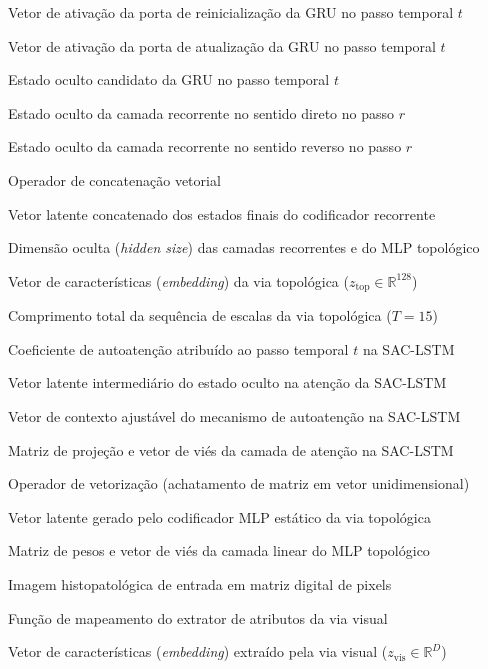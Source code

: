 \documentclass[
  12pt,		
  a4paper,	
  openright,  
  oneside,	
  chapter=TITLE,		
  section=TITLE,		
  english,	
  french,	    
  spanish,	
  brazil	    
]{abntex2}
\begin{document}
\begin{simbolos}
        \item[$r_t$] Vetor de ativação da porta de reinicialização da GRU no passo temporal $t$
        \item[$z_t$] Vetor de ativação da porta de atualização da GRU no passo temporal $t$
        \item[$\tilde{h}_t$] Estado oculto candidato da GRU no passo temporal $t$
        \item[$\overrightarrow{h}_r$] Estado oculto da camada recorrente no sentido direto no passo $r$
        \item[$\overleftarrow{h}_r$] Estado oculto da camada recorrente no sentido reverso no passo $r$
        \item[$\Vert$] Operador de concatenação vetorial
        \item[$h_{\mathrm{rec}}$] Vetor latente concatenado dos estados finais do codificador recorrente
        \item[$h$] Dimensão oculta (\textit{hidden size}) das camadas recorrentes e do MLP topológico
        \item[$z_{\mathrm{top}}$] Vetor de características (\textit{embedding}) da via topológica ($z_{\mathrm{top}} \in \mathbb{R}^{128}$)
        \item[$T$] Comprimento total da sequência de escalas da via topológica ($T = 15$)
        \item[$\alpha_t$] Coeficiente de autoatenção atribuído ao passo temporal $t$ na SAC-LSTM
        \item[$u_t$] Vetor latente intermediário do estado oculto na atenção da SAC-LSTM
        \item[$u_s$] Vetor de contexto ajustável do mecanismo de autoatenção na SAC-LSTM
        \item[$W_a, b_a$] Matriz de projeção e vetor de viés da camada de atenção na SAC-LSTM
        \item[$\operatorname{vec}(\cdot)$] Operador de vetorização (achatamento de matriz em vetor unidimensional)
        \item[$h_{\mathrm{mlp}}$] Vetor latente gerado pelo codificador MLP estático da via topológica
        \item[$W_t, b_t$] Matriz de pesos e vetor de viés da camada linear do MLP topológico
        \item[$I$] Imagem histopatológica de entrada em matriz digital de pixels
        \item[$f_{\mathrm{vis}}(\cdot)$] Função de mapeamento do extrator de atributos da via visual
        \item[$z_{\mathrm{vis}}$] Vetor de características (\textit{embedding}) extraído pela via visual ($z_{\mathrm{vis}} \in \mathbb{R}^D$)

\end{simbolos}
\end{document}
